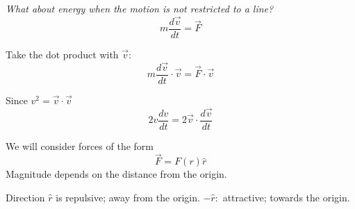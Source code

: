 \documentclass[10pt]{scrartcl}
\begin{document}
\emph{What about energy when the motion is not restricted to a line?}
\[m\frac{d\vec{v}}{dt} = \vec{F}\]

Take the dot product with $\vec{v}$:
\[m\frac{d\vec{v}}{dt}\cdot{\vec{v}} = \vec{F}\cdot\vec{v}\]

Since $v^2 = \vec{v}\cdot\vec{v}$
\[2v\frac{dv}{dt} = 2\vec{v}\cdot\frac{d\vec{v}}{dt}\]









We  will consider forces of the form
\[\vec{F} = F(r)\hat{r}\]
Magnitude depends on the distance from the origin. 

Direction $\hat{r}$ is repulsive; away from the origin. $-\hat{r}:$ attractive; towards the origin.\\ 
\end{document}
